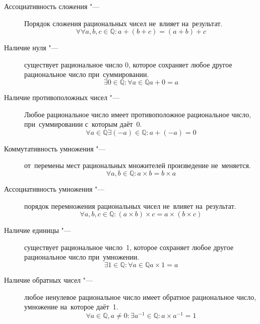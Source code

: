 \documentclass[]{scrartcl}
\begin{document}
\begin{description}
\begin{description}
		\item[Ассоциативность сложения "---] Порядок сложения рациональных чисел не~влияет на~результат.
		\begin{equation}\label{eq:rational-numbers-addition-associativity}
		\forall \forall a,b,c \in \mathbb{Q}: a+(b+c)=(a+b)+c
		\end{equation}
		\item[Наличие нуля "---] существует рациональное число 0, которое сохраняет любое другое рациональное число при~суммировании.
		\begin{equation}\label{eq:rational-numbers-zero}
		\exists 0 \in \mathbb{Q}: \forall a \in \mathbb{Q} a+0=a
		\end{equation}
		\item[Наличие противоположных чисел "---] Любое рациональное число имеет противоположное рациональное число, при~суммировании с~которым даёт~0.
		\begin{equation}\label{eq:eq:rational-numbers-opposite}
		\forall a \in \mathbb{Q} \exists (-a) \in \mathbb{Q}: a+(-a)=0
		\end{equation}
		\item[Коммутативность умножения "---] от~перемены мест рациональных множителей произведение не~меняется.
		\begin{equation}\label{eq:rational-numbers-production-commutativity}
		\forall a,b \in \mathbb{Q}: a \times b = b \times a
		\end{equation}
		\item[Ассоциативность умножения "---] порядок перемножения рациональных чисел не~влияет на~результат.
		\begin{equation}\label{eq:rational-numbers-production-associativity}
		\forall a,b,c \in \mathbb{Q}: (a \times b) \times c = a \times (b \times c)
		\end{equation}
		\item[Наличие единицы "---] существует рациональное число~1, которое сохраняет любое другое рациональное число при~умножении.
		\begin{equation}\label{eq:rational-number-one}
		\exists 1 \in \mathbb{Q}: \forall a \in \mathbb{Q} a \times 1 = a
		\end{equation}
		\item[Наличие обратных чисел "---] любое ненулевое рациональное число имеет обратное рациональное число, умножение на~которое даёт~1.
		\begin{equation}\label{eq:rational-opposite-numbers}
		\forall a \in \mathbb{Q}, a \neq 0: \exists a^{-1} \in \mathbb{Q}: a \times a^{-1} = 1

\end{equation}
\end{description}
\end{description}
\end{document}
